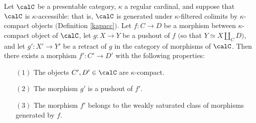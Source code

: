 \begin{lemma}\label{tirun}
Let $\calC$ be a presentable category, $\kappa$ a regular cardinal, and suppose that $\calC$ is $\kappa$-accessible: that is, $\calC$ is generated under $\kappa$-filtered colimits by $\kappa$-compact objects $($Definition \ref{kapacc}$)$. Let $f: C \rightarrow D$ be a morphism between $\kappa$-compact object of $\calC$, let
$g: X \rightarrow Y$ be a pushout of $f$ $($so that $Y \simeq X \coprod_{C} D${}$)$, and let
$g': X' \rightarrow Y'$ be a retract of $g$ in the category of morphisms of $\calC$.
Then there exists a morphism $f': C' \rightarrow D'$ with the following properties:
\begin{itemize}
\item[$(1)$] The objects $C', D' \in \calC$ are $\kappa$-compact.
\item[$(2)$] The morphism $g'$ is a pushout of $f'$.
\item[$(3)$] The morphism $f'$ belongs to the weakly saturated class of morphisms generated by $f$.
\end{itemize}
\end{lemma}

